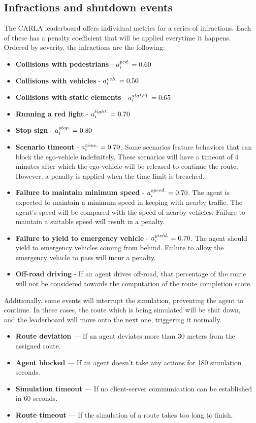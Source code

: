 \documentclass{article}
\begin{document}
\subsection{Infractions and shutdown events}
The CARLA leaderboard offers individual metrics for a series of infractions. Each of these has a penalty coefficient that will be applied everytime it happens. 
Ordered by severity, the infractions are the following:
\begin{itemize}
    \item \textbf{Collisions with pedestrians} - $a_{\small{i}}^{\small{ped.}} = 0.60$
    \item \textbf{Collisions with vehicles} - $a_{\small{i}}^{\small{veh.}} = 0.50$
    \item \textbf{Collisions with static elements} - $a_{\small{i}}^{\small{statEl.}} = 0.65$
    \item \textbf{Running a red light } - $a_{\small{i}}^{\small{light.}} = 0.70$
    \item \textbf{Stop sign} - $a_{\small{i}}^{\small{stop.}} = 0.80$
    \item \textbf{Scenario timeout} - $a_{\small{i}}^{\small{time.}} = 0.70$. Some scenarios feature behaviors that can block the ego-vehicle indefinitely. 
            These scenarios will have a timeout of 4 minutes after which the ego-vehicle will be released to continue the route. However, a penalty is applied when 
            the time limit is breached.
    \item \textbf{Failure to maintain minimum speed} - $a_{\small{i}}^{\small{speed.}} = 0.70$. The agent is expected to maintain a minimum speed in keeping with nearby traffic.
            The agent’s speed will be compared with the speed of nearby vehicles. Failure to maintain a suitable speed will result in a penalty.
    \item \textbf{Failure to yield to emergency vehicle} - $a_{\small{i}}^{\small{yield.}} = 0.70$. The agent should yield to emergency vehicles coming from behind. Failure to allow the emergency vehicle to pass will incur a penalty.
    \item \textbf{Off-road driving} - If an agent drives off-road, that percentage of the route will not be considered towards the computation of the route completion score.
\end{itemize}

Additionally, some events will interrupt the simulation, preventing the agent to continue. In these cases, the route which is being simulated will be shut down, and the 
leaderboard will move onto the next one, triggering it normally.
\begin{itemize}
    \item \textbf{Route deviation} — If an agent deviates more than 30 meters from the assigned route.
    \item \textbf{Agent blocked} — If an agent doesn’t take any actions for 180 simulation seconds.
    \item \textbf{Simulation timeout} — If no client-server communication can be established in 60 seconds.
    \item \textbf{Route timeout} — If the simulation of a route takes too long to finish.
\end{itemize}
\end{document}

